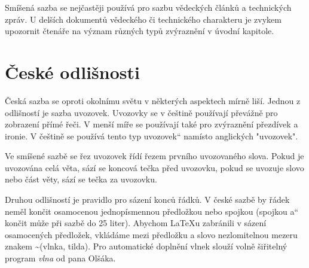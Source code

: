 \documentclass[a4paper,twocolumn,11pt]{article}
\newcommand{\myuv}[1]{\quotedblbase #1\textquotedblleft}
\begin{document}
     	Smíšená sazba se nejčastěji používá pro sazbu vědeckých článků a technických zpráv. U delších dokumentů vědeckého či technického charakteru je zvykem upozornit čtenáře na význam různých typů zvýraznění v úvodní kapitole.
     	
     	\section{České odlišnosti}
     	
     	Česká sazba se oproti okolnímu světu v některých aspektech mírně liší. Jednou z odlišností je sazba uvozovek. Uvozovky se v češtině používají převážně pro zobrazení přímé řeči. V menší míře se používají také pro zvýraznění přezdívek a ironie. V češtině se používá tento \myuv{typ uvozovek} namísto anglických "uvozovek".
     	
     	Ve smíšené sazbě se řez uvozovek řídí řezem prvního uvozovaného slova. Pokud je uvozována celá věta, sází se koncová tečka před uvozovku, pokud se uvozuje slovo nebo část věty, sází se tečka za uvozovku.
     	
     	Druhou odlišností je pravidlo pro sázení konců řádků. V české sazbě by řádek neměl končit osamocenou jednopísmennou předložkou nebo spojkou (spojkou \myuv{a} končit může při sazbě do 25 liter). Abychom \LaTeX u zabránili v sázení osamocených předložek, vkládáme mezi předložku a slovo nezlomitelnou mezeru znakem \textasciitilde \enspace (vlnka, tilda). Pro automatické doplnění vlnek slouží volně šiřitelný program \textit{vlna} od pana Olšáka\footnotemark.
     	
     	
	
\end{document}
